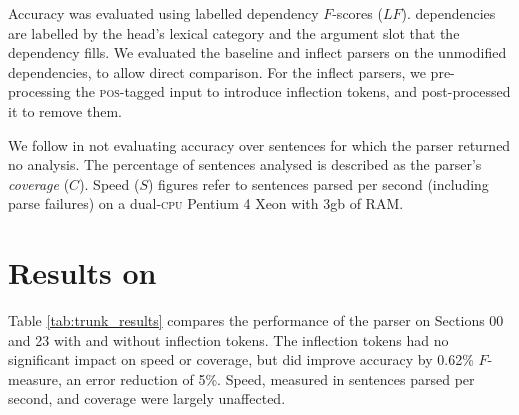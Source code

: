 \documentclass[11pt]{article}
\begin{document}
Accuracy was evaluated using labelled dependency $F$-scores ($LF$). \ccg 
dependencies are labelled by the head's lexical category and 
the argument slot that the dependency fills.
We evaluated the baseline and inflect parsers on the unmodified dependencies,
to allow direct comparison. For the inflect parsers, we 
pre-processing the \textsc{pos}-tagged input to introduce
inflection tokens, and post-processed it to remove them.

We follow \citet{clark:cl07} in not evaluating accuracy over sentences for which
the parser returned no analysis. The percentage of sentences analysed is described
as the parser's \emph{coverage} ($C$). Speed ($S$) figures refer to sentences parsed
per second (including parse failures) on a dual-\textsc{cpu} Pentium 4 Xeon with 3gb of RAM.



\section{Results on \ccgbank}

Table \ref{tab:trunk_results} compares the performance of the parser
on Sections 00 and 23 with and without inflection tokens. The inflection tokens
had no significant impact on speed or coverage, but did improve accuracy by
0.62\% $F$-measure, an error reduction of 5\%. Speed, measured in sentences parsed per second,
 and coverage were largely unaffected.
\end{document}

